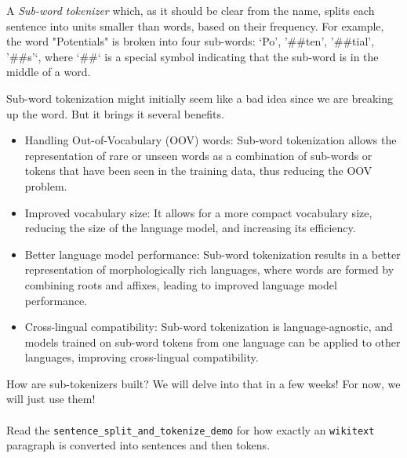 A \textit{Sub-word tokenizer} which, as it should be clear from the name, splits each sentence into units smaller than words, based on their frequency. For example, the word "Potentials" is broken into four sub-words: `Po', '\#\#ten', '\#\#tial', '\#\#s'`, where `\#\#` is a special symbol indicating that the sub-word is in the middle of a word.


Sub-word tokenization might initially seem like a bad idea since we are breaking up the word. But it brings it several benefits.
\begin{itemize}
    \item Handling Out-of-Vocabulary (OOV) words: Sub-word tokenization allows the representation of rare or unseen words as a combination of sub-words or tokens that have been seen in the training data, thus reducing the OOV problem.
    \item Improved vocabulary size: It allows for a more compact vocabulary size, reducing the size of the language model, and increasing its efficiency.
    \item Better language model performance: Sub-word tokenization results in a better representation of morphologically rich languages, where words are formed by combining roots and affixes, leading to improved language model performance.
    \item Cross-lingual compatibility: Sub-word tokenization is language-agnostic, and models trained on sub-word tokens from one language can be applied to other languages, improving cross-lingual compatibility.
    
\end{itemize}

How are sub-tokenizers built? We will delve into that in a few weeks! For now, we will just use them!
\\\\
\noindent Read the \texttt{sentence\_split\_and\_tokenize\_demo} for how exactly an \texttt{wikitext} paragraph is converted into sentences and then tokens.

